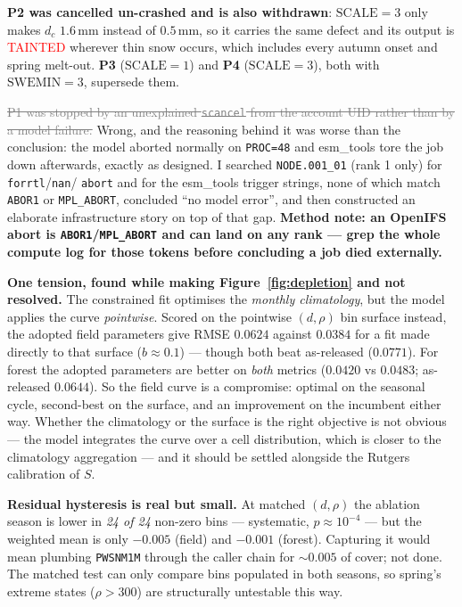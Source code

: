 \documentclass[10pt]{article}
\newcommand{\dead}[1]{\textcolor{gray}{\sout{#1}}}
\begin{document}
\textbf{P2 was cancelled un-crashed and is also withdrawn}: $\mathrm{SCALE}=3$ only makes $d_c$
$1.6$\,mm instead of $0.5$\,mm, so it carries the same defect and its output is
\textcolor{red}{TAINTED} wherever thin snow occurs, which includes every autumn onset and
spring melt-out. \textbf{P3} ($\mathrm{SCALE}=1$) and \textbf{P4} ($\mathrm{SCALE}=3$), both
with $\mathrm{SWEMIN}=3$, supersede them.

\dead{P1 was stopped by an unexplained \texttt{scancel} from the account UID rather than by a
model failure.} Wrong, and the reasoning behind it was worse than the conclusion: the model
aborted normally on \texttt{PROC=48} and esm\_tools tore the job down afterwards, exactly as
designed. I searched \texttt{NODE.001\_01} (rank 1 only) for \texttt{forrtl}/\texttt{nan}/
\texttt{abort} and for the esm\_tools trigger strings, none of which match \texttt{ABOR1} or
\texttt{MPL\_ABORT}, concluded ``no model error'', and then constructed an elaborate
infrastructure story on top of that gap. \textbf{Method note: an OpenIFS abort is
\texttt{ABOR1}/\texttt{MPL\_ABORT} and can land on any rank --- grep the whole compute log for
those tokens before concluding a job died externally.}

\textbf{One tension, found while making Figure~\ref{fig:depletion} and not resolved.} The
constrained fit optimises the \emph{monthly climatology}, but the model applies the curve
\emph{pointwise}. Scored on the pointwise $(d,\rho)$ bin surface instead, the adopted field
parameters give RMSE $0.0624$ against $0.0384$ for a fit made directly to that surface
($b\approx0.1$) --- though both beat as-released ($0.0771$). For forest the adopted parameters
are better on \emph{both} metrics ($0.0420$ vs $0.0483$; as-released $0.0644$). So the field
curve is a compromise: optimal on the seasonal cycle, second-best on the surface, and an
improvement on the incumbent either way. Whether the climatology or the surface is the right
objective is not obvious --- the model integrates the curve over a cell distribution, which is
closer to the climatology aggregation --- and it should be settled alongside the Rutgers
calibration of $S$.

\textbf{Residual hysteresis is real but small.} At matched $(d,\rho)$ the ablation season is
lower in \emph{24 of 24} non-zero bins --- systematic, $p\approx10^{-4}$ --- but the weighted
mean is only $-0.005$ (field) and $-0.001$ (forest). Capturing it would mean plumbing
\texttt{PWSNM1M} through the caller chain for ${\sim}0.005$ of cover; not done. The matched
test can only compare bins populated in both seasons, so spring's extreme states ($\rho>300$)
are structurally untestable this way.
\end{document}
